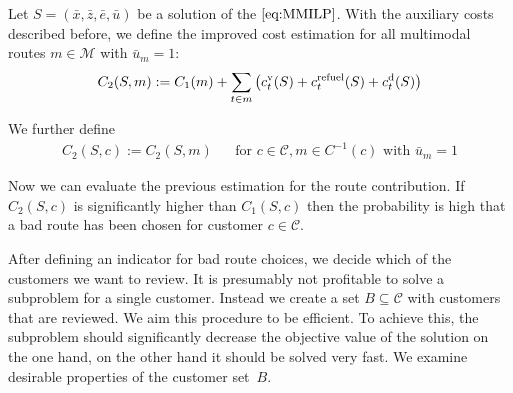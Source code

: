 \begin{definition}

Let $S=\left(\bar{x},\bar{z},\bar{e},\bar{u}\right)$ be a solution of the $\eqref{eq:MMILP}$. With the auxiliary costs described before, we define the improved cost estimation for all multimodal routes ${m\in\mathcal{M}}$ with ${\bar{u}_m=1}$:
\begin{align*}
	C_2(S,m) := C_1(m) + \sum_{t\in m}\left(c^{\operatorname{v}}_t(S) + c^{\operatorname{refuel}}_t(S) + c^{\operatorname{d}}_t(S)\right)
\end{align*}

We further define
\begin{align*}
	C_2(S,c) := C_2(S,m) && \text{for } c\in\mathcal{C},m\in C^{-1}(c) \text{ with } \bar{u}_m = 1
\end{align*}

\end{definition}

Now we can evaluate the previous estimation for the route contribution. If $C_2(S,c)$ is significantly higher than $C_1(S,c)$ then the probability is high that a bad route has been chosen for customer $c\in\mathcal{C}$.

After defining an indicator for bad route choices, we decide which of the customers we want to review. It is presumably not profitable to solve a subproblem for a single customer. Instead we create a set ${B\subseteq\mathcal{C}}$ with customers that are reviewed. We aim this procedure to be efficient. To achieve this, the subproblem should significantly decrease the objective value of the solution on the one hand, on the other hand it should be solved very fast. We examine desirable properties of the customer set~$B$.

